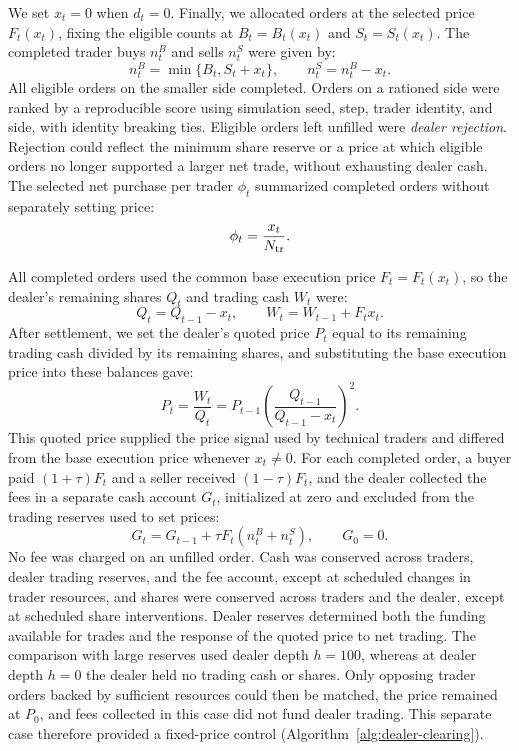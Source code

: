 We set $x_t=0$ when $d_t=0$. Finally, we allocated orders at the
selected price $F_t(x_t)$, fixing the eligible counts at
$B_t=B_t(x_t)$ and $S_t=S_t(x_t)$. The completed trader buys $n_t^B$
and sells $n_t^S$ were given by:
\begin{equation}
 n_t^B=\min\{B_t,S_t+x_t\},\qquad n_t^S=n_t^B-x_t.
 \label{eq:dealer-sell-excess}
\end{equation}
All eligible orders on the smaller side completed. Orders on a rationed
side were ranked by a reproducible score using simulation seed, step,
trader identity, and side, with identity breaking ties. Eligible orders left unfilled were
\emph{dealer rejection}. Rejection could reflect the minimum share
reserve or a price at which eligible orders no longer supported a
larger net trade, without exhausting dealer cash. The selected net purchase per trader $\phi_t$ summarized completed
orders without separately setting price:
\begin{equation}
 \phi_t=\frac{x_t}{N_{\rm tr}}.
 \label{eq:imbalance}
\end{equation}

All completed orders used the common base execution price
$F_t=F_t(x_t)$, so the dealer's remaining shares $Q_t$ and trading cash
$W_t$ were:
\begin{equation}
 Q_t=Q_{t-1}-x_t,\qquad W_t=W_{t-1}+F_tx_t.
 \label{eq:dealer-ledger}
\end{equation}
After settlement, we set the dealer's quoted price $P_t$ equal to its
remaining trading cash divided by its remaining shares, and substituting
the base execution price into these balances gave:
\begin{equation}
 P_t=\frac{W_t}{Q_t}
     =P_{t-1}\left(\frac{Q_{t-1}}{Q_{t-1}-x_t}\right)^2.
 \label{eq:price-update}
\end{equation}
This quoted price supplied the price signal used by technical traders
and differed from the base execution price whenever $x_t\ne0$. For each
completed order, a buyer paid $(1+\tau)F_t$ and a seller received
$(1-\tau)F_t$, and the dealer collected the fees in a separate cash
account $G_t$, initialized at zero and excluded from the trading
reserves used to set prices:
\begin{equation}
 G_t=G_{t-1}+\tau F_t(n_t^B+n_t^S),\qquad G_0=0.
 \label{eq:dealer-fees}
\end{equation}
No fee was charged on an unfilled order. Cash was conserved across
traders, dealer trading reserves, and the fee account, except at
scheduled changes in trader resources, and shares were conserved across
traders and the dealer, except at scheduled share interventions. Dealer reserves determined both the funding
available for trades and the response of the quoted price to net
trading. The comparison with large reserves used dealer depth $h=100$,
whereas at dealer depth $h=0$ the dealer held no trading cash or shares.
Only opposing trader orders backed by sufficient resources could then be
matched, the price remained at $P_0$, and fees collected in this case
did not fund dealer trading. This separate case therefore provided a
fixed-price control (Algorithm~\ref{alg:dealer-clearing}).

